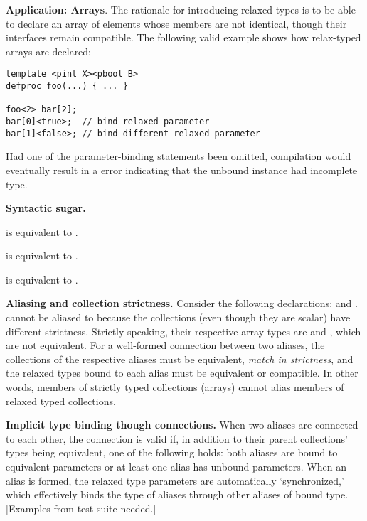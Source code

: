 \textbf{Application: Arrays}.
The rationale for introducing relaxed types is to be able to 
declare an array of elements whose members are not identical, 
though their interfaces remain compatible.
The following valid example shows how relax-typed arrays are
declared:

\begin{verbatim}
template <pint X><pbool B>
defproc foo(...) { ... }

foo<2> bar[2];
bar[0]<true>;  // bind relaxed parameter
bar[1]<false>; // bind different relaxed parameter
\end{verbatim}

\noindent
Had one of the parameter-binding statements been omitted, 
compilation would eventually result in a error indicating
that the unbound instance had incomplete type.  

\textbf{Syntactic sugar.}

\noindent
{}
is equivalent to
.

\noindent
{}
is equivalent to
.

\noindent
{}
is equivalent to
.

\textbf{Aliasing and collection strictness.}
Consider the following declarations:
 and
.
 cannot be aliased to  because the collections
(even though they are scalar) have different strictness.  
Strictly speaking, their respective array types are
 and , which are not equivalent.
For a well-formed connection between two aliases, 
the collections of the respective aliases must be equivalent, 
\emph{match in strictness}, and the relaxed types
bound to each alias must be equivalent or compatible.  
In other words, members of strictly typed collections (arrays) cannot
alias members of relaxed typed collections.  

\textbf{Implicit type binding though connections.}
When two aliases are connected to each other, 
the connection is valid if, 
in addition to their parent collections' types being equivalent, 
one of the following holds:
both aliases are bound to equivalent parameters
or at least one alias has unbound parameters.
When an alias is formed, the relaxed type parameters are
automatically `synchronized,' which effectively binds the type
of aliases through other aliases of bound type.  
[Examples from test suite needed.]


